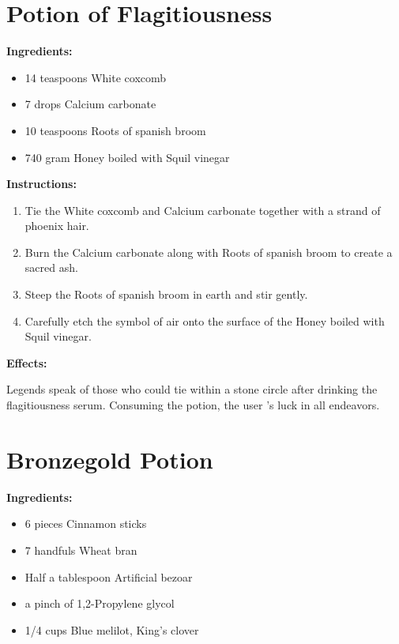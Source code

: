 \documentclass{article}
\begin{document}
\newpage
\section*{Potion of Flagitiousness}

\textbf{Ingredients:}

\begin{itemize}
  \item 14 teaspoons White coxcomb
  \item 7 drops Calcium carbonate
  \item 10 teaspoons Roots of spanish broom
  \item 740 gram Honey boiled with  Squil vinegar
\end{itemize}

\textbf{Instructions:}

\begin{enumerate}
  \item Tie the White coxcomb and Calcium carbonate together with a strand of phoenix hair.
  \item Burn the Calcium carbonate along with Roots of spanish broom to create a sacred ash.
  \item Steep the Roots of spanish broom in earth and stir gently.
  \item Carefully etch the symbol of air onto the surface of the Honey boiled with  Squil vinegar.
\end{enumerate}

\textbf{Effects:}

Legends speak of those who could tie within a stone circle after drinking the flagitiousness serum. Consuming the potion, the user 's luck in all endeavors.

\newpage
\section*{Bronzegold Potion}

\textbf{Ingredients:}

\begin{itemize}
  \item 6 pieces Cinnamon sticks
  \item 7 handfuls Wheat bran
  \item Half a tablespoon Artificial bezoar
  \item a pinch of 1,2-Propylene glycol
  \item 1/4 cups Blue melilot, King's clover
\end{itemize}
\end{document}
